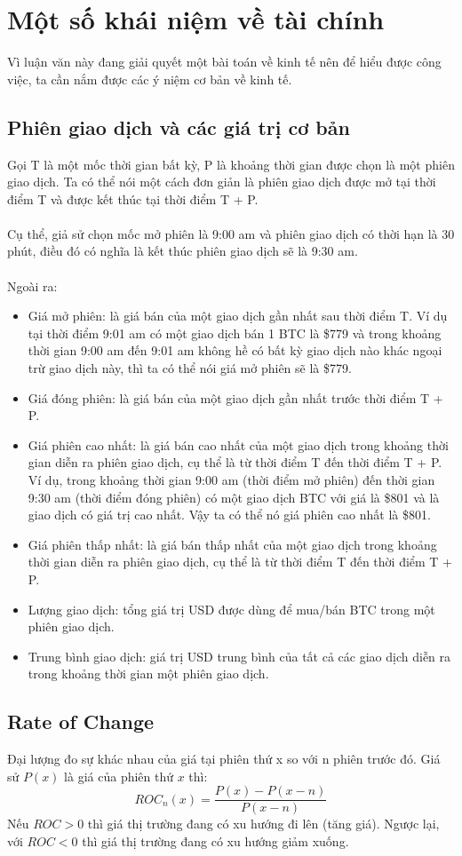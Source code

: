\section{Một số khái niệm về tài chính}
Vì luận văn này đang giải quyết một bài toán về kinh tế nên để hiểu được công 
việc, ta cần nắm được các ý niệm cơ bản về kinh tế.
\subsection{Phiên giao dịch và các giá trị cơ bản}
Gọi T là một mốc thời gian bất kỳ, P là khoảng thời gian được chọn là một phiên 
giao dịch. Ta có thể nói một cách đơn giản là phiên giao dịch được mở tại thời 
điểm T và được kết thúc tại thời điểm T + P.\\\\
Cụ thể, giả sử chọn mốc mở phiên là 9:00 am và phiên giao dịch có thời hạn là 
30 phút, điều đó có nghĩa là kết thúc phiên giao dịch sẽ là 9:30 am.\\\\
Ngoài ra:
\begin{itemize}
\item Giá mở phiên: là giá bán của một giao dịch gần nhất sau thời điểm T. Ví dụ tại thời 
điểm 9:01 am có một giao dịch bán 1 BTC là \$779 và trong khoảng thời gian 9:00 am 
đến 9:01 am không hề có bất kỳ giao dịch nào khác ngoại trừ giao dịch này, thì ta có thể 
nói giá mở phiên sẽ là \$779.
\item Giá đóng phiên: là giá bán của một giao dịch gần nhất trước thời điểm T + P.
\item Giá phiên cao nhất: là giá bán cao nhất của một giao dịch trong khoảng thời gian diễn ra phiên 
giao dịch, cụ thể là từ thời điểm T đến thời điểm T + P. Ví dụ, trong khoảng thời gian 9:00 am (thời điểm 
mở phiên) đến thời gian 9:30 am (thời điểm đóng phiên) có một giao dịch BTC với giá là 
\$801 và là giao dịch có giá trị cao nhất. Vậy ta có thể nó giá phiên cao nhất là 
\$801.
\item Giá phiên thấp nhất: là giá bán thấp nhất của một giao dịch trong khoảng thời gian diễn ra phiên 
giao dịch, cụ thể là từ thời điểm T đến thời điểm T + P.
\item Lượng giao dịch: tổng giá trị USD được dùng để  mua/bán BTC trong một phiên giao dịch.
\item Trung bình giao dịch: giá trị USD trung bình của tất cả các giao dịch diễn 
ra trong khoảng thời gian một phiên giao dịch.
\end{itemize}
\subsection{Rate of Change}
Đại lượng đo sự khác nhau của giá tại phiên thứ x so với n phiên trước đó. 
Giá sử $P(x)$ là giá của phiên thứ $x$ thì:
\[ ROC_{n}(x)=\frac{P(x)-P(x-n)}{P(x-n)}\]
Nếu $ROC > 0$ thì giá thị trường đang có xu hướng đi lên (tăng giá).
Ngược lại, với $ROC < 0$ thì giá thị trường đang có xu hướng giảm xuống.
